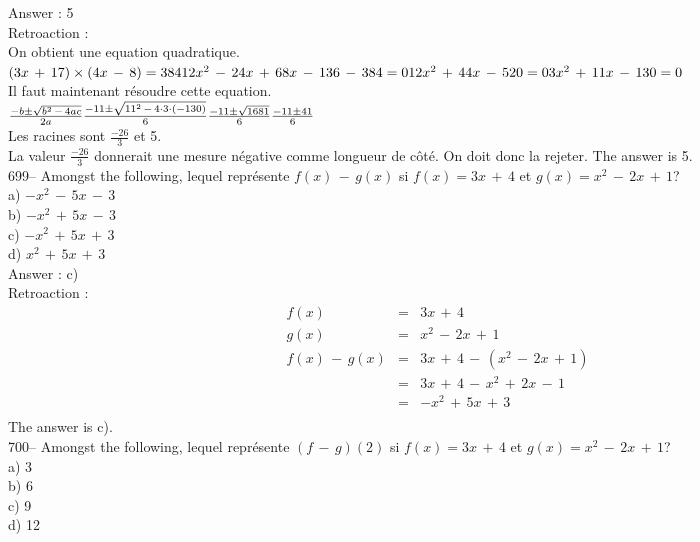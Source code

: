 ﻿\documentclass[letterpaper, 12pt]{article}
\begin{document}
Answer : 5\\

Retroaction : \\
On obtient une equation quadratique.  \\
$(3x\,+\,17)\times(4x\,-\,8)=384\\
12x^{2}\,-\,24x\,+\,68x\,-\,136\,-\,384=0\\
12x^{2}\,+\,44x\,-\,520=0\\
3x^{2}\,+\,11x\,-\,130=0$\\
Il faut maintenant r\'esoudre cette equation.\\[2mm]
$\frac{-b\pm\sqrt{b^{2}\,-\,4ac}}{2a}\\[2mm]
\frac{-11\pm \sqrt{11^{2}\,-\,4\cdot3\cdot(-130)}}{6}\\[2mm]
\frac{-11\pm \sqrt{1681}}{6}\\[2mm]
\frac{-11\pm 41}{6}$\\[2mm]
Les racines sont $\frac{-26}{3}$ et 5.\\[2mm]
La valeur $\frac{-26}{3}$ donnerait une mesure n\'egative comme longueur de
c\^ot\'e. On doit donc la rejeter.  The answer is 5.\\

699-- Amongst the following, lequel repr\'esente $f(x)\,-\,g(x)$
si $f(x)=3x\,+\,4$ et $g(x)=x^{2}\,-\,2x\,+\,1$?\\
a) $-x^{2}\,-\,5x\,-\,3$\\
b) $-x^{2}\,+\,5x\,-\,3$\\
c) $-x^{2}\,+\,5x\,+\,3$\\
d) $x^{2}\,+\,5x\,+\,3$\\

Answer : c)\\

Retroaction : \\
\begin{eqnarray*}
f(x)&=&3x\,+\,4\\
g(x)&=&x^{2}\,-\,2x\,+\,1\\
f(x)\,-\,g(x)&=&3x\,+\,4\,-\,(x^{2}\,-\,2x\,+\,1)\\
&=&3x\,+\,4\,-\,x^{2}\,+\,2x\,-\,1\\
&=&-x^{2}\,+\,5x\,+\,3\\
\end{eqnarray*}
The answer is c).\\

700-- Amongst the following, lequel repr\'esente $(f\,-\,g)(2)$
si $f(x)=3x\,+\,4$ et $g(x)=x^{2}\,-\,2x\,+\,1$?\\
a) 3\\
b) 6\\
c) 9\\
d) 12\\
\end{document}
